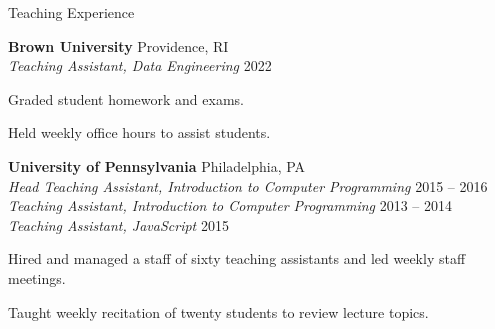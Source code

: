 \documentclass{resume} %
\begin{document}

\begin{grouping}{Teaching Experience}

\item {\bf Brown University } \hfill Providence, RI \\
    {\em Teaching Assistant, Data Engineering} \hfill 2022
    \begin{items}
        \item Graded student homework and exams.
        \item Held weekly office hours to assist students.
    \end{items}

\item {\bf University of Pennsylvania } \hfill Philadelphia, PA \\
    {\em Head Teaching Assistant, Introduction to Computer Programming} \hfill 2015 -- 2016 \\
    {\em Teaching Assistant, Introduction to Computer Programming} \hfill 2013 -- 2014 \\
    {\em Teaching Assistant, JavaScript} \hfill 2015
    \begin{items}
        \item Hired and managed a staff of sixty teaching assistants and led weekly staff meetings.
        \item Taught weekly recitation of twenty students to review lecture topics.
    \end{items}

\end{grouping}

\end{document}
